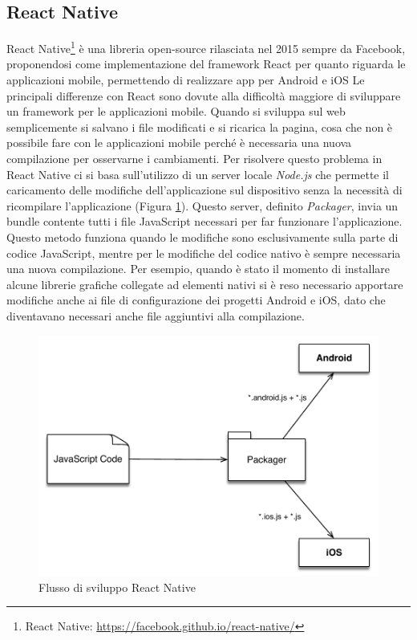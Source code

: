 \subsection{React Native}\label{sec:react-native}
React Native\footnote{React Native: \url{https://facebook.github.io/react-native/}} è una libreria open-source rilasciata nel 2015 sempre da Facebook, proponendosi come implementazione del framework React per quanto riguarda le applicazioni mobile, permettendo di realizzare app per Android e iOS
Le principali differenze con React sono dovute alla difficoltà maggiore di sviluppare un framework per le applicazioni mobile. 
Quando si sviluppa sul web semplicemente si salvano i file modificati e si ricarica la pagina, cosa che non è possibile fare con le applicazioni mobile perché è necessaria una nuova compilazione per osservarne i cambiamenti.
Per risolvere questo problema in React Native ci si basa sull'utilizzo di un server locale \emph{Node.js} che permette il caricamento delle modifiche dell'applicazione sul dispositivo senza la necessità di ricompilare l'applicazione (Figura \ref{fig:flusso-sviluppo-react-native}). 
Questo server, definito \emph{Packager}, invia un bundle contente tutti i file JavaScript necessari per far funzionare l'applicazione. Questo metodo funziona quando le modifiche sono esclusivamente sulla parte di codice JavaScript, mentre per le modifiche del codice nativo è sempre necessaria una nuova compilazione. Per esempio, quando è stato il momento di installare alcune librerie grafiche collegate ad elementi nativi si è reso necessario apportare modifiche anche ai file di configurazione dei progetti Android e iOS, dato che diventavano necessari anche file aggiuntivi alla compilazione.

\begin{figure}[ht]
	\centering
	\includegraphics[width=\textwidth]{6-implementazione-app/immagini/flusso-sviluppo-react-native.pdf}
	\caption{Flusso di sviluppo React Native\label{fig:flusso-sviluppo-react-native}}
\end{figure}

